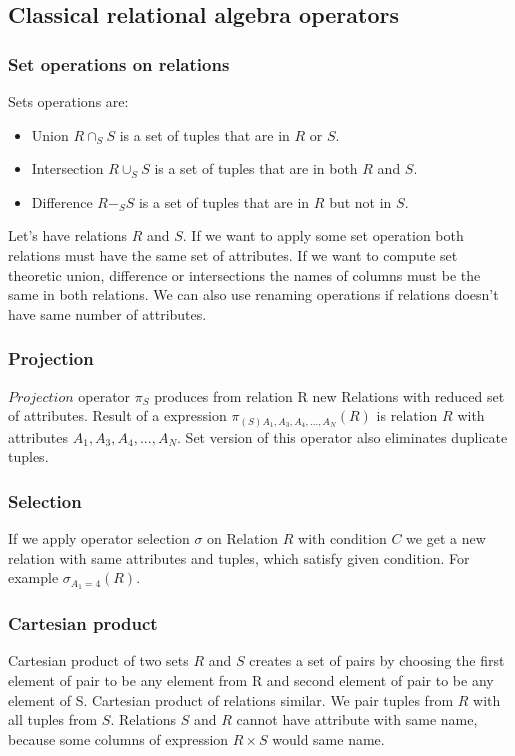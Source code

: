\subsection{Classical relational algebra operators}
\subsubsection{Set operations on relations}

Sets operations are:
\begin{itemize}
\item Union $R\cap_S S$ is a set of tuples that are in $R$ or $S$.
\item Intersection $R\cup_S S$  is a set of tuples that are in both $R$ and $S$. 
\item Difference $R-_S S$ is a set of tuples that are in $R$ but not in $S$.

\end{itemize}

Let's have relations $R$ and $S$. If we want to apply some set operation both relations must have the same set of attributes. If we want to compute set theoretic union, difference or intersections the names of columns must be the same in both relations. 
We can also use renaming operations if relations doesn't have same number of attributes.

\subsubsection{Projection}
\label{projection}
$Projection$ operator $\pi_S$ produces from relation R new Relations with reduced set of attributes. Result of a expression $\pi_{(S) A_1,A_3,A_4,...,A_N}(R)$ is relation $R$ with attributes $A_1,A_3,A_4,...,A_N$. Set version of this operator also eliminates duplicate tuples.

\subsubsection{Selection}
If we apply operator selection $\sigma$ on Relation $R$ with condition $C$ we get a new relation with same attributes and tuples, which satisfy given condition. For example $\sigma_{A_1=4}(R)$.

\subsubsection{Cartesian product}
Cartesian product of two sets $R$ and $S$ creates a set of pairs by choosing the first element of pair to be any element from R and second element of pair to be any element of S. Cartesian product of relations similar. We pair tuples from $R$ with all tuples from $S$. Relations $S$ and $R$ cannot have attribute with same name, because some columns of expression $R\times S$ would same name.

